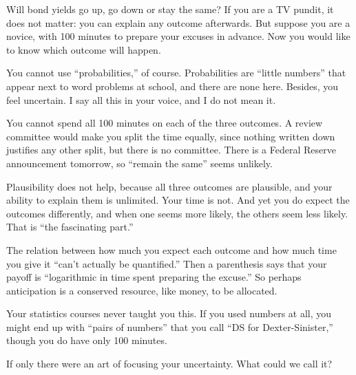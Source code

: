 
Will bond yields go up, go down or stay the same? If you are a TV pundit, it does not matter: you can explain any outcome afterwards. But suppose you are a novice, with 100 minutes to prepare your excuses in advance. Now you would like to know which outcome will happen.

You cannot use ``probabilities,'' of course. Probabilities are ``little numbers'' that appear next to word problems at school, and there are none here. Besides, you feel uncertain. I say all this in your voice, and I do not mean it.

You cannot spend all 100 minutes on each of the three outcomes. A review committee would make you split the time equally, since nothing written down justifies any other split, but there is no committee. There is a Federal Reserve announcement tomorrow, so ``remain the same'' seems unlikely.

Plausibility does not help, because all three outcomes are plausible, and your ability to explain them is unlimited. Your time is not. And yet you do expect the outcomes differently, and when one seems more likely, the others seem less likely. That is ``the fascinating part.''

The relation between how much you expect each outcome and how much time you give it ``can't actually be quantified.'' Then a parenthesis says that your payoff is ``logarithmic in time spent preparing the excuse.''  So perhaps anticipation is a conserved resource, like money, to be allocated.

Your statistics courses never taught you this. If you used numbers at all, you might end up with ``pairs of numbers'' that you call ``DS for Dexter-Sinister,'' though you do have only 100 minutes. 

If only there were an art of focusing your uncertainty. What could we call it? 
